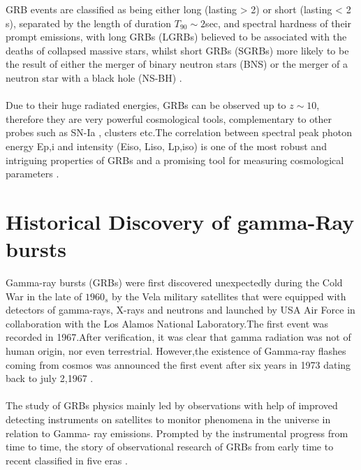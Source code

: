 GRB  events are  classified   as being  either  long  (lasting > 2) or short (lasting < 2 s), separated  by  the length  of duration $T_{90} \sim 2 $sec, and  spectral hardness of their prompt emissions, with long  GRBs (LGRBs) believed to be associated with the  deaths of collapsed  massive  stars, whilst  short  GRBs (SGRBs) more likely to be  the  result of  either  the  merger of  binary  neutron  stars (BNS) or the  merger  of  a neutron  star  with  a black  hole (NS-BH) \citep{3}.\\\\
Due to their huge radiated energies, GRBs can be observed up to $z  \sim 10$, therefore they are very powerful cosmological tools, complementary to other probes such as SN-Ia , clusters etc.The correlation between spectral peak photon energy Ep,i and intensity (Eiso, Liso, Lp,iso) is one of the most robust and intriguing properties of GRBs and a promising tool for measuring cosmological parameters \citep{2, 3}.
\section{Historical Discovery of gamma-Ray bursts }
Gamma-ray bursts (GRBs) were first discovered unexpectedly during the Cold War
in the late of $1960_{s}$  by the Vela military satellites that  were equipped with detectors of gamma-rays, X-rays and neutrons and launched by USA Air Force in collaboration with the Los Alamos National Laboratory.The first event was recorded in 1967.After verification, it was clear that gamma radiation was not of human origin, nor even terrestrial. However,the existence of Gamma-ray flashes coming from cosmos was  announced the first event after six years in 1973 dating back to july 2,1967 \citep{4}.\\\\ 
The study of GRBs physics mainly led by observations with help of improved detecting instruments on satellites to monitor phenomena in the universe in relation to  Gamma- ray emissions.  Prompted by the instrumental progress from time to time, the story of observational research of GRBs from early time to recent  classified in five eras  \citep{4} \citep { 5}.\\\\
